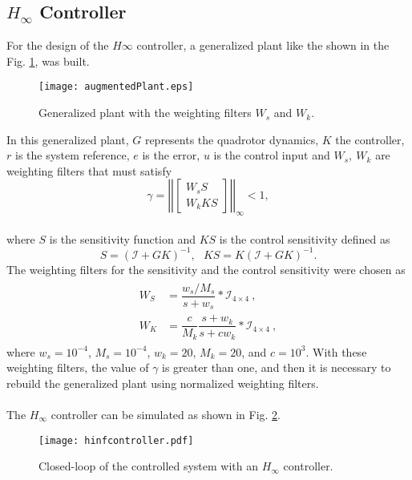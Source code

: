 \subsection{$H_\infty$ Controller}
For the design of the $H\infty$ controller, a generalized plant like the shown in the Fig. \ref{fig:augmentedPlant}, was built.
\begin{figure}[H]
	\begin{center}
	\texttt{[image: augmentedPlant.eps]}
	\caption{Generalized plant with the weighting filters $W_s$ and $W_k$.}
	\label{fig:augmentedPlant}
	\end{center}
	\end{figure}	
In this generalized plant, $G$ represents the quadrotor dynamics, $K$ the controller, $r$ is the system reference, $e$ is the error, $u$ is the control input and $W_{s},\ W_{k}$ are weighting filters that must satisfy 
	\begin{equation}\label{eqn:hinf}
	\gamma = \left|\left|\begin{bmatrix}
	W_{s}S\\W_{k}KS
	\end{bmatrix}\right|\right|_{\infty} < 1,
	\end{equation}
\\where $S$ is the sensitivity function and $KS$ is the control sensitivity defined as
	\begin{equation}
	S = (\mathcal{I} + GK)^{-1},\ \ \ KS = K(\mathcal{I} + GK)^{-1}.
	\end{equation}
The weighting filters for the sensitivity and the control sensitivity were chosen as
\begin{align}\label{eqn:wswk}
\begin{split}
W_{S} &= \dfrac{w_{s}/M_{s}}{s + w_{s}}*\mathcal{I}_{4\times4}\ ,\\
W_{K} &= \dfrac{c}{M_{k}}\dfrac{s+w_{k}}{s+cw_{k}}*\mathcal{I}_{4\times4}\ ,
\end{split}
\end{align}
where $w_{s} = 10^{-4}$, $M_{s} = 10^{-4}$, $w_{k} = 20$, $M_{k} = 20$, and $c = 10^{3}$. With these weighting filters, the value of $\gamma$ is greater than one, and then it is necessary to rebuild the generalized plant using normalized weighting filters.
\\\\The $H_{\infty}$ controller can be simulated as shown in Fig. \ref{fig:hinfcontroller}.
	\begin{figure}[h]
	\begin{center}
	\texttt{[image: hinfcontroller.pdf]}
	\caption{Closed-loop of the controlled system with an $H_{\infty}$ controller.}
	\label{fig:hinfcontroller}
	\end{center}
	\end{figure}
